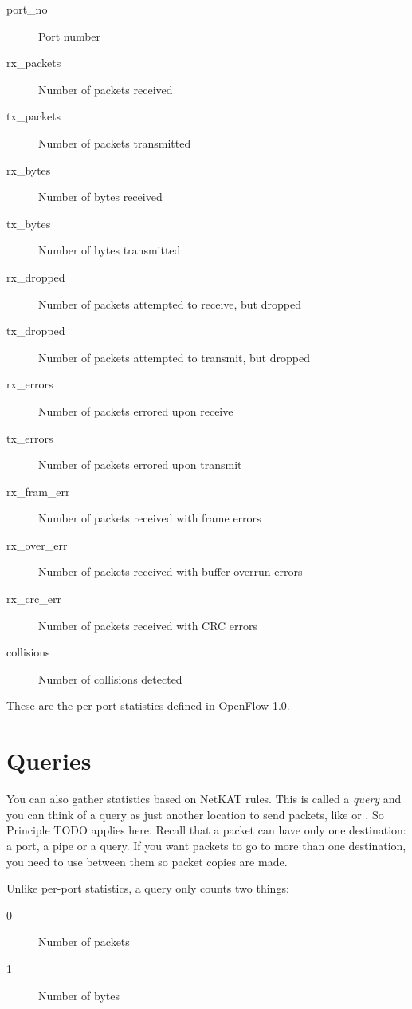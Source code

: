 \begin{description}
\item[port\_no] Port number  
\item[rx\_packets] Number of packets received  
\item[tx\_packets] Number of packets transmitted  
\item[rx\_bytes] Number of bytes received  
\item[tx\_bytes] Number of bytes transmitted  
\item[rx\_dropped] Number of packets attempted to receive, but dropped  
\item[tx\_dropped] Number of packets attempted to transmit, but dropped
\item[rx\_errors] Number of packets errored upon receive 
\item[tx\_errors] Number of packets errored upon transmit
\item[rx\_fram\_err] Number of packets received with frame errors
\item[rx\_over\_err] Number of packets received with buffer overrun errors
\item[rx\_crc\_err] Number of packets received with CRC errors
\item[collisions] Number of collisions detected
\end{description}

These are the per-port statistics defined in OpenFlow 1.0.  

\section{Queries}
\label{statistics:queries}

You can also gather statistics based on NetKAT rules.  This is called a \emph{query} and you can think 
of a query as just another location to send packets, like  or .
So Principle TODO applies here.  Recall that a packet can have only one destination: a port, a pipe or a 
query.  If you want packets to go to more than one destination, you need to use  between
them so packet copies are made.

Unlike per-port statistics, a query only counts two things:

\begin{description}
\item[0] Number of packets  
\item[1] Number of bytes  
\end{description}

